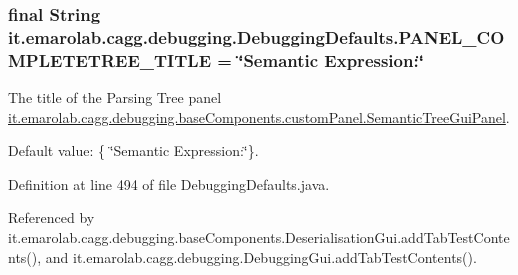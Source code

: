 \hypertarget{classit_1_1emarolab_1_1cagg_1_1debugging_1_1DebuggingDefaults_a621515d88b2f9bc0376ab79ac8060ba0}{
\subsubsection[{P\-A\-N\-E\-L\-\_\-\-C\-O\-M\-P\-L\-E\-T\-E\-T\-R\-E\-E\-\_\-\-T\-I\-T\-L\-E}]{\setlength{\rightskip}{0pt plus 5cm}final String it.\-emarolab.\-cagg.\-debugging.\-Debugging\-Defaults.\-P\-A\-N\-E\-L\-\_\-\-C\-O\-M\-P\-L\-E\-T\-E\-T\-R\-E\-E\-\_\-\-T\-I\-T\-L\-E = \char`\"{}Semantic Expression\-:\char`\"{}\hspace{0.3cm}{\ttfamily [static]}}}\label{classit_1_1emarolab_1_1cagg_1_1debugging_1_1DebuggingDefaults_a621515d88b2f9bc0376ab79ac8060ba0}
The title of the Parsing Tree panel \hyperlink{classit_1_1emarolab_1_1cagg_1_1debugging_1_1baseComponents_1_1customPanel_1_1SemanticTreeGuiPanel}{it.\-emarolab.\-cagg.\-debugging.\-base\-Components.\-custom\-Panel.\-Semantic\-Tree\-Gui\-Panel}.\par
 Default value\-: \{ \char`\"{}\-Semantic Expression\-:\char`\"{}\}. 

Definition at line 494 of file Debugging\-Defaults.\-java.



Referenced by it.\-emarolab.\-cagg.\-debugging.\-base\-Components.\-Deserialisation\-Gui.\-add\-Tab\-Test\-Contents(), and it.\-emarolab.\-cagg.\-debugging.\-Debugging\-Gui.\-add\-Tab\-Test\-Contents().

